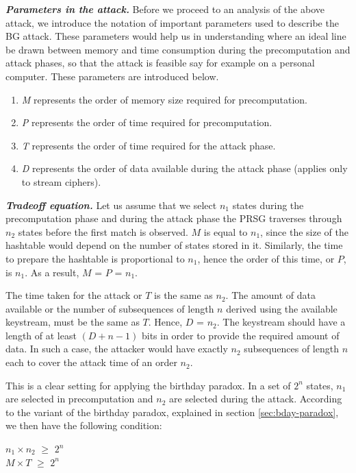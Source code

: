 \textit{\textbf{Parameters in the attack.}} Before we proceed to an analysis of the above attack, we introduce the notation of important parameters used to describe the BG attack. These parameters would help us in understanding where an ideal line be drawn between memory and time consumption during the precomputation and attack phases, so that the attack is feasible say for example on a personal computer. These parameters are introduced below. 

\begin{enumerate}
\item \emph{M} represents the order of memory size required for precomputation.
\item \emph{P} represents the order of time required for precomputation.
\item \emph{T} represents the order of time required for the attack phase.
\item \emph{D} represents the order of data available during the attack phase (applies only to stream ciphers).
\end{enumerate}

\textit{\textbf{Tradeoff equation.}} Let us assume that we select $n_1$ states during the precomputation phase and during the attack phase the PRSG traverses through $n_2$ states before the first match is observed. $M$ is equal to $n_1$, since the size of the hashtable would depend on the number of states stored in it. Similarly, the time to prepare the hashtable is proportional to $n_1$, hence the order of this time, or $P$, is $n_1$. As a result, $M$ = $P$ = $n_1$.

The time taken for the attack or $T$ is the same as $n_2$. The amount of data available or the number of subsequences of length $n$ derived using the available keystream, must be the same as $T$. Hence, $D$ = $n_2$. The keystream should have a length of at least $(D + n - 1)$ bits in order to provide the required amount of data. In such a case, the attacker would have exactly $n_2$ subsequences of length $n$ each to cover the attack time of an order $n_2$.

This is a clear setting for applying the birthday paradox. In a set of $2^n$ states, $n_1$ are selected in precomputation and $n_2$ are selected during the attack. According to the variant of the birthday paradox, explained in section \ref{sec:bday-paradox}, we then have the following condition:

\begin{center}
\large{$n_1 \times n_2$ $\geq$ $2^n$}\\
\large{$M \times T$ $\geq$ $2^n$}\\
\end{center}

